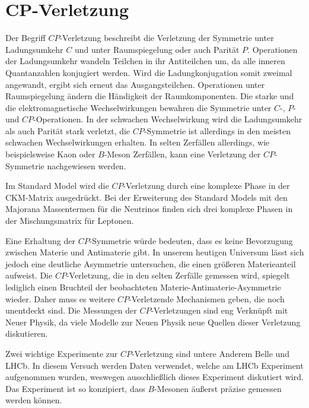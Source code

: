 \section{CP-Verletzung}

Der Begriff $CP$-Verletzung beschreibt die Verletzung der Symmetrie unter Ladungsumkehr $C$ und unter
Raumspiegelung oder auch Parität $P$. Operationen der Ladungsumkehr wandeln Teilchen in ihr 
Antiteilchen um, da alle inneren Quantanzahlen konjugiert werden. Wird die Ladungkonjugation somit 
zweimal angewandt, ergibt sich erneut das Ausgangsteilchen. Operationen unter Raumspiegelung ändern 
die Händigkeit der Raumkomponenten. Die starke und die elektromagnetische Wechselwirkungen bewahren 
die Symmetrie unter $C$-, $P$- und $CP$-Operationen. In der schwachen Wechselwirkung wird die 
Ladungsumkehr als auch Parität stark verletzt, die $CP$-Symmetrie ist allerdings in den meisten 
schwachen Wechselwirkungen erhalten. In selten Zerfällen allerdings, wie beispielsweise Kaon 
oder $B$-Meson Zerfällen, kann eine Verletzung der $CP$-Symmetrie nachgewiesen werden.  \par 

Im Standard Model wird die $CP$-Verletzung durch eine komplexe Phase in der CKM-Matrix 
ausgedrückt. Bei der Erweiterung des Standard Models mit den Majorana Massentermen für die 
Neutrinos finden sich drei komplexe Phasen in der Mischungsmatrix für Leptonen. \par 

Eine Erhaltung der $CP$-Symmetrie würde bedeuten, dass es keine Bevorzugung zwischen Materie und 
Antimaterie gibt. In unserem heutigen Universum lässt sich jedoch eine deutliche Asymmetrie 
untersuchen, die einen größeren Materieanteil aufweist. Die $CP$-Verletzung, die in den selten 
Zerfälle gemessen wird, spiegelt lediglich einen Bruchteil der beobachteten Materie-Antimaterie-Asymmetrie 
wieder. Daher muss es weitere $CP$-Verletzende Mechanismen geben, die noch unentdeckt sind. Die 
Messungen der $CP$-Verletzungen sind eng Verknüpft mit Neuer Physik, da viele Modelle zur Neuen 
Physik neue Quellen dieser Verletzung diskutieren. \par 

Zwei wichtige Experimente zur $CP$-Verletzung sind untere Anderem Belle und LHCb. In diesem 
Versuch werden Daten verwendet, welche am LHCb Experiment aufgenommen wurden, weswegen 
ausschließlich dieses Experiment diskutiert wird. Das Experiment ist so konzipiert, dass 
$B$-Mesonen äußerst präzise gemessen werden können. \par

